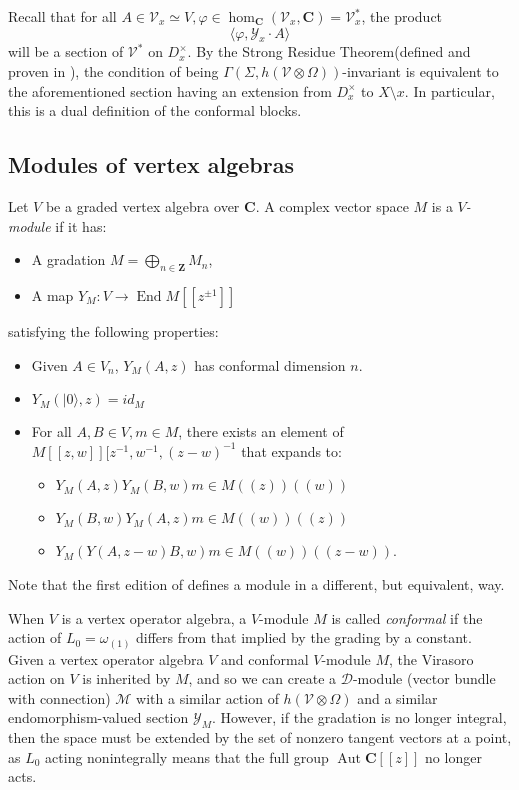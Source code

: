 \documentclass{article}
\newcommand{\CC}{\mathbold{C}}
\newcommand{\ZZ}{\mathbold{Z}}
\newcommand{\vac}{|0\rangle}
\newcommand{\Dd}{\mathcal{D}}
\newcommand{\Mm}{\mathcal{M}}
\newcommand{\Vv}{\mathcal{V}}
\newcommand{\Yy}{\mathcal{Y}}
\DeclareMathOperator{\End}{End}
\DeclareMathOperator{\Aut}{Aut}
\begin{document}
Recall that for all $A \in \Vv_x \simeq V, \varphi \in \hom_\CC(\Vv_x,\CC) = \Vv_x^*$, the product
\[\langle \varphi,\Yy_x \cdot A \rangle \]
will be a section of $\Vv^*$ on $D_x^\times$.  By the Strong Residue Theorem(defined and proven in \cite{MR0227171}), the condition of being $\Gamma(\Sigma,h(\Vv \otimes \Omega))$-invariant is equivalent to the aforementioned section having an extension from $D_x^\times$ to $X \setminus x$.  In particular, this is a dual definition of the conformal blocks.

\subsection{Modules of vertex algebras}
\label{sec:voareps}
Let $V$ be a graded vertex algebra over $\CC$.  A complex vector space $M$ is a \textit{$V$-module} if it has:
\begin{itemize}
\item A gradation $M=\bigoplus_{n \in \ZZ}M_n$,
\item A map $Y_M: V \rightarrow \End{M[[z^{\pm 1}]]}$
\end{itemize}
satisfying the following properties:
\begin{itemize}
\item Given $A \in V_n$, $Y_M(A,z)$ has conformal dimension $n$.
\item $Y_M(\vac,z)=id_M$
\item For all $A,B \in V, m \in M$, there exists an element of $M[[z,w]][z^{-1},w^{-1},(z-w)^{-1}$ that expands to:
  \begin{itemize}
  \item $Y_M(A,z)Y_M(B,w)m \in M((z))((w))$
  \item $Y_M(B,w)Y_M(A,z)m \in M((w))((z))$
  \item $Y_M(Y(A,z-w)B,w)m \in M((w))((z-w))$.
  \end{itemize}

\end{itemize}
Note that the first edition of \cite{MR2082709} defines a module in a different, but equivalent, way.

When $V$ is a vertex operator algebra, a $V$-module $M$ is called \textit{conformal} if the action of $L_0=\omega_{(1)}$ differs from that implied by the grading by a constant.  Given a vertex operator algebra $V$ and conformal $V$-module $M$, the Virasoro action on $V$ is inherited by $M$, and so we can create a $\Dd$-module (vector bundle with connection) $\Mm$ with a similar action of $h(\Vv \otimes \Omega)$ and a similar endomorphism-valued section $\Yy_M$.  However, if the gradation is no longer integral, then the space must be extended by the set of nonzero tangent vectors at a point, as $L_0$ acting nonintegrally means that the full group $\Aut \CC[[z]]$ no longer acts.
\end{document}
